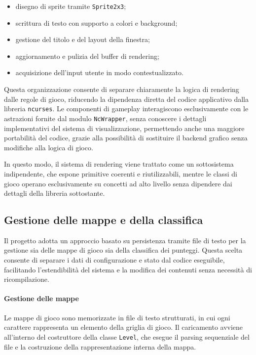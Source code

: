 \documentclass[a4paper,11pt]{article}
\begin{document}
\begin{itemize}
    \item disegno di sprite tramite \texttt{Sprite2x3};
    \item scrittura di testo con supporto a colori e background;
    \item gestione del titolo e del layout della finestra;
    \item aggiornamento e pulizia del buffer di rendering;
    \item acquisizione dell'input utente in modo contestualizzato.
\end{itemize}

Questa organizzazione consente di separare chiaramente la logica di rendering dalle regole di gioco, 
riducendo la dipendenza diretta del codice applicativo dalla libreria \texttt{ncurses}. 
Le componenti di gameplay interagiscono esclusivamente con le astrazioni fornite dal modulo \texttt{NcWrapper}, 
senza conoscere i dettagli implementativi del sistema di visualizzazione, permettendo anche una
maggiore portabilità del codice, grazie alla possibilità di sostituire il backend grafico senza modifiche alla logica di gioco.

In questo modo, il sistema di rendering viene trattato come un sottosistema indipendente, 
che espone primitive coerenti e riutilizzabili, mentre le classi di gioco operano esclusivamente 
su concetti ad alto livello senza dipendere dai dettagli della libreria sottostante.


\subsection{Gestione delle mappe e della classifica}

Il progetto adotta un approccio basato su persistenza tramite file di testo per la gestione sia delle mappe 
di gioco sia della classifica dei punteggi. Questa scelta consente di separare i dati di configurazione e stato 
dal codice eseguibile, facilitando l'estendibilità del sistema e la modifica dei contenuti senza necessità di ricompilazione.

\paragraph{Gestione delle mappe}

Le mappe di gioco sono memorizzate in file di testo strutturati, in cui ogni carattere rappresenta un elemento 
della griglia di gioco. Il caricamento avviene all'interno del costruttore della classe \texttt{Level}, 
che esegue il parsing sequenziale del file e la costruzione della rappresentazione interna della mappa.
\end{document}
